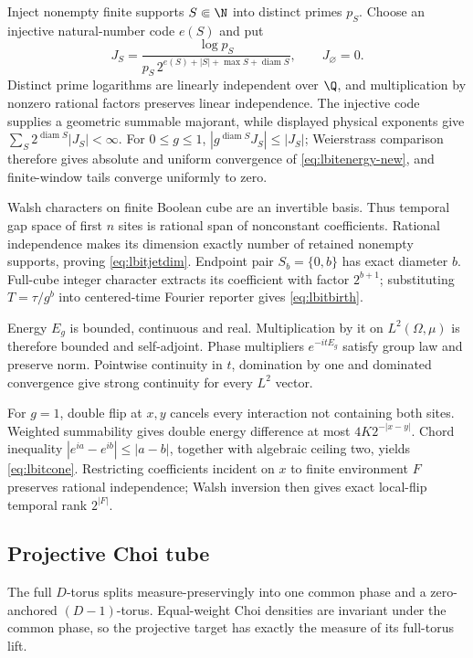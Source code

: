 Inject nonempty finite supports $S\Subset\N$ into distinct primes $p_S$.
Choose an injective natural-number code $e(S)$ and put
\[
 J_S=\frac{\log p_S}
 {p_S\,2^{e(S)+|S|+\max S+\operatorname{diam}S}},
 \qquad J_\varnothing=0.
\]
Distinct prime logarithms are linearly independent over $\Q$, and
multiplication by nonzero rational factors preserves linear independence.
The injective code supplies a geometric summable majorant, while displayed
physical exponents give
$\sum_S2^{\operatorname{diam}S}|J_S|<\infty$.  For $0\le g\le1$,
$|g^{\operatorname{diam}S}J_S|\le|J_S|$; Weierstrass comparison therefore
gives absolute and uniform convergence of \eqref{eq:lbitenergy-new}, and
finite-window tails converge uniformly to zero.

Walsh characters on finite Boolean cube are an invertible basis.  Thus
temporal gap space of first $n$ sites is rational span of nonconstant
coefficients.  Rational independence makes its dimension exactly number of
retained nonempty supports, proving \eqref{eq:lbitjetdim}.  Endpoint pair
$S_b=\{0,b\}$ has exact diameter $b$.  Full-cube integer character extracts
its coefficient with factor $2^{b+1}$; substituting
$T=\tau/g^b$ into centered-time Fourier reporter gives
\eqref{eq:lbitbirth}.

Energy $E_g$ is bounded, continuous and real.  Multiplication by it on
$L^2(\Omega,\mu)$ is therefore bounded and self-adjoint.  Phase
multipliers $e^{-itE_g}$ satisfy group law and preserve norm.  Pointwise
continuity in $t$, domination by one and dominated convergence give strong
continuity for every $L^2$ vector.

For $g=1$, double flip at $x,y$ cancels every interaction not containing
both sites.  Weighted summability gives double energy difference at most
$4K2^{-|x-y|}$.  Chord inequality
$|e^{ia}-e^{ib}|\le|a-b|$, together with algebraic ceiling two, yields
\eqref{eq:lbitcone}.  Restricting coefficients incident on $x$ to finite
environment $F$ preserves rational independence; Walsh inversion then gives
exact local-flip temporal rank $2^{|F|}$.

\subsection{Projective Choi tube}

The full $D$-torus splits measure-preservingly into one common phase and a
zero-anchored $(D-1)$-torus.  Equal-weight Choi densities are invariant under
the common phase, so the projective target has exactly the measure of its
full-torus lift.

